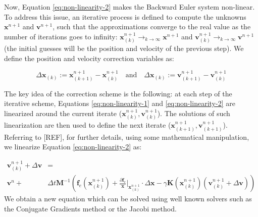 \documentclass{article} %
\begin{document}
Now, Equation \ref{eq:non-linearity-2} makes the Backward Euler system non-linear. To address this issue, an iterative process is defined to compute the unknowns $\mathbf{x}^{n+1}$ and $\mathbf{v}^{n+1}$, such that the approximations converge to the real value as the number of iterations goes to infinity: $\mathbf{x}^{n+1}_{(k)} \rightarrow_{k \rightarrow \infty} \mathbf{x}^{n+1}$ and $\mathbf{v}^{n+1}_{(k)} \rightarrow_{k \rightarrow \infty} \mathbf{v}^{n+1}$ (the initial guesses will be the position and velocity of the previous step). We define the position and velocity correction variables as:
 
 $$\Delta \mathbf{x}_{(k)} := \mathbf{x}^{n+1}_{(k+1)} -  \mathbf{x}^{n+1}_{(k)}\quad \text{and}\quad \Delta \mathbf{x}_{(k)} := \mathbf{v}^{n+1}_{(k+1)} - \mathbf{v}^{n+1}_{(k)}$$

The key idea of the correction scheme is the following: at each step of the iterative scheme, Equations \ref{eq:non-linearity-1} and \ref{eq:non-linearity-2} are linearized around the current iterate ($\mathbf{x}^{n+1}_{(k)}, \mathbf{v}^{n+1}_{(k)}$). The solutions of such linearization are then used to define the next iterate ($\mathbf{x}^{n+1}_{(k+1)}, \mathbf{v}^{n+1}_{(k+1)}$). Referring to [REF], for further details, using some mathematical manipulation, we linearize Equation \ref{eq:non-linearity-2} as:

\begin{align}
\mathbf{v}^{n+1}_{(k)} + \Delta \mathbf{v} &=\nonumber\\ 
\mathbf{v}^n + &\Delta t \mathbf{M}^{-1} \left (  \mathbf{f}_e ( \mathbf{x}^{n+1}_{(k)} ) + \frac{\partial \mathbf{f}_e}{\mathbf{x}} \big |_{\mathbf{x}^{n+1}_{(k)}} \cdot \Delta \mathbf{x} - \gamma \mathbf{K} (\mathbf{x}^{n+1}_{(k)} ) ( \mathbf{v}^{n+1}_{(k)} + \Delta \mathbf{v}) \right )\label{eq:linearized-v}
\end{align}
We obtain a new equation which can be solved using well known solvers such as the Conjugate Gradients method or the Jacobi method. 
\end{document}
